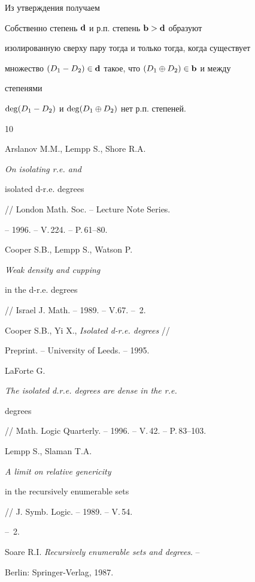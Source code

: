 Из утверждения получаем





\begin{sled}\label{krit}


Собственно \pp степень ${\bold d}$ и р.п. степень ${\bold b}>{\bold d}$ образуют


изолированную сверху пару тогда и только тогда, когда существует \pp 


множество $(D_1-D_2)\in{\bold d}$ такое, что $(D_1\oplus D_2)\in{\bold b}$ и между


степенями


$\deg(D_1-D_2)$ и $\deg(D_1\oplus D_2)$ нет р.п. степеней.


\end{sled}





\begin{thebibliography}{10}





 Arslanov M.M., Lempp S., Shore R.A.


{\em On isolating r.e. and 


isolated d-r.e. degrees} // London Math. Soc. -- Lecture Note Series.


-- 1996. -- V.\,224. -- P.\,61--80.





 Cooper S.B., Lempp S., Watson P.


{\em Weak density and cupping


in the d-r.e. degrees} // Israel J. Math. -- 1989. -- V.67. -- \No\,2.





 Cooper S.B., Yi X., {\em Isolated d-r.e. degrees} //


Preprint. --  University of Leeds. -- 1995.





 LaForte G. {\em The isolated d.r.e. degrees are dense in the r.e.


degrees} // Math. Logic Quarterly. -- 1996. -- V.\,42. -- P.\,83--103.





 Lempp S., Slaman T.A. {\em A limit on relative genericity


in the recursively enumerable sets} // J. Symb. Logic. -- 1989. -- V.\,54.


-- \No\,2.





 Soare R.I. {\it Recursively enumerable sets and degrees}. --


Berlin: Springer-Verlag, 1987.





\end{thebibliography}





